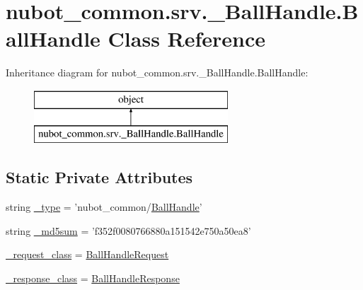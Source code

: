 \hypertarget{classnubot__common_1_1srv_1_1__BallHandle_1_1BallHandle}{\section{nubot\-\_\-common.\-srv.\-\_\-\-Ball\-Handle.\-Ball\-Handle Class Reference}
\label{classnubot__common_1_1srv_1_1__BallHandle_1_1BallHandle}
}
Inheritance diagram for nubot\-\_\-common.\-srv.\-\_\-\-Ball\-Handle.\-Ball\-Handle\-:\begin{figure}[H]
\begin{center}
\leavevmode
\includegraphics[height=2.000000cm]{classnubot__common_1_1srv_1_1__BallHandle_1_1BallHandle}
\end{center}
\end{figure}
\subsection*{Static Private Attributes}
\begin{DoxyCompactItemize}
\item 
string \hyperlink{classnubot__common_1_1srv_1_1__BallHandle_1_1BallHandle_a6d0b7cb7054baf22ce4e0bc9192e0119}{\-\_\-type} = 'nubot\-\_\-common/\hyperlink{classnubot__common_1_1srv_1_1__BallHandle_1_1BallHandle}{Ball\-Handle}'
\item 
string \hyperlink{classnubot__common_1_1srv_1_1__BallHandle_1_1BallHandle_a83ea79b587ab8d1abdf18beb1f233810}{\-\_\-md5sum} = 'f352f0080766880a151542e750a50ea8'
\item 
\hyperlink{classnubot__common_1_1srv_1_1__BallHandle_1_1BallHandle_a7460e96f88e2f37969f980dd2fa58ccc}{\-\_\-request\-\_\-class} = \hyperlink{classnubot__common_1_1srv_1_1__BallHandle_1_1BallHandleRequest}{Ball\-Handle\-Request}
\item 
\hyperlink{classnubot__common_1_1srv_1_1__BallHandle_1_1BallHandle_a599c590fe0e77877fa44be92112e04b5}{\-\_\-response\-\_\-class} = \hyperlink{classnubot__common_1_1srv_1_1__BallHandle_1_1BallHandleResponse}{Ball\-Handle\-Response}
\end{DoxyCompactItemize}


